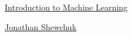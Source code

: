\documentclass[11pt]{article}
\begin{document}
	\kaishu 
	\setcounter{section}{0}
	\begin{center}
		{\LARGE  \href{https://people.eecs.berkeley.edu/~jrs/189s24/}{Introduction to Machine Learning}}
		
		\vspace{-0.25cm}
		
		{\large \href{https://people.eecs.berkeley.edu/~jrs/}{Jonathan Shewchuk}}
	\end{center}
\setcounter{page}{1}

\vspace{-1cm}
\end{document}
